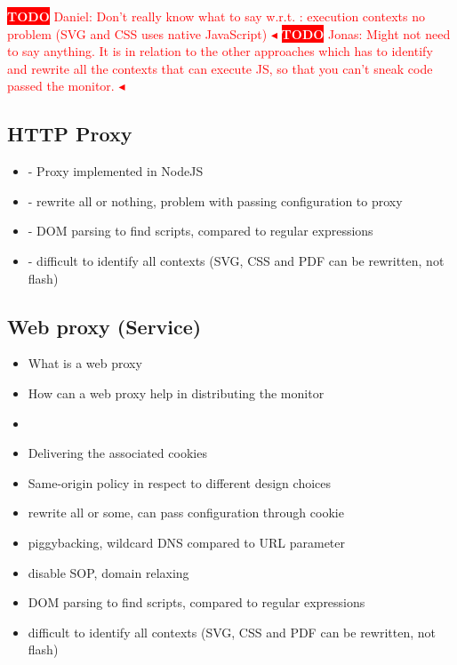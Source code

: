 \documentclass{llncs}
\newcommand{\todo}[1]{\colorbox{red}{\textcolor{white}{\sffamily\bfseries\scriptsize TODO}} \textcolor{red}{#1} \textcolor{red}{$\blacktriangleleft$}}
\begin{document}
\todo{Daniel: Don't really know what to say w.r.t. : execution contexts no problem (SVG and CSS uses native JavaScript)}
\todo{Jonas: Might not need to say anything. It is in relation to the other approaches which has to identify and rewrite all the contexts that can execute JS, so that you can't sneak code passed the monitor.}


\subsection{HTTP Proxy}

\begin{itemize}
\item- Proxy implemented in NodeJS
\item- rewrite all or nothing, problem with passing configuration to proxy
\item- DOM parsing to find scripts, compared to regular expressions
\item- difficult to identify all contexts (SVG, CSS and PDF can be rewritten, not flash)
\end{itemize}



\subsection{Web proxy (Service)}

\begin{itemize}
\item What is a web proxy
\item How can a web proxy help in distributing the monitor
\item 
\item Delivering the associated cookies
\item Same-origin policy in respect to different design choices
\item rewrite all or some, can pass configuration through cookie
\item piggybacking, wildcard DNS compared to URL parameter
\item disable SOP, domain relaxing
\item DOM parsing to find scripts, compared to regular expressions
\item difficult to identify all contexts (SVG, CSS and PDF can be rewritten, not flash)
\end{itemize}
\end{document}
